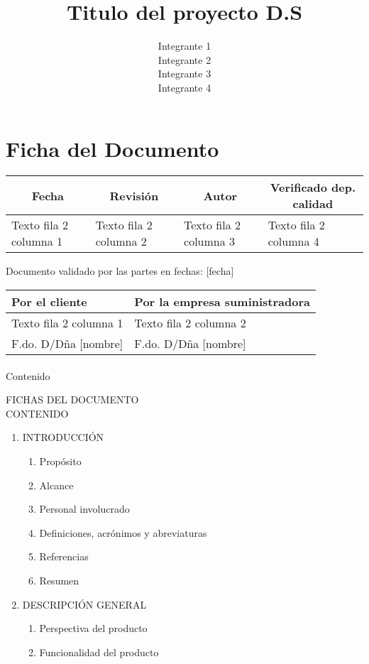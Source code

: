 \documentclass {article}
\title{Titulo del proyecto D.S}
\author{Integrante 1\\Integrante 2\\Integrante 3\\Integrante 4}
\begin{document}
\maketitle
\newpage
\section*{Ficha del Documento} 

\begin{table}[h!]
  \centering
  \begin{tabular}{|c|c|c|c|}
    \hline
    \textbf{Fecha} & \textbf{Revisión} & \textbf{Autor} & \textbf{Verificado dep. calidad} \\
    \hline
    \multicolumn{1}{|l|}{Texto fila 2 columna 1} & \multicolumn{1}{l|}{Texto fila 2 columna 2} & \multicolumn{1}{l|}{Texto fila 2 columna 3} & \multicolumn{1}{l|}{Texto fila 2 columna 4} \\
    \hline
  \end{tabular}
\end{table}
Documento validado por las partes en fechas: [fecha]
\begin{table}[h!]
  \centering
  \begin{tabular}{|l|l|}
    \hline
    \textbf{Por el cliente} & \textbf{Por la empresa suministradora} \\
    \hline
    Texto fila 2 columna 1 & Texto fila 2 columna 2 \\ \hline
    F.do. D/Dña [nombre] & F.do. D/Dña [nombre] \\ \hline
  \end{tabular}
\end{table}
\paragraph{}
\newpage
\begin{center} %
{\Huge Contenido} %
\end{center}
\vspace{1cm} %
{FICHAS DEL DOCUMENTO\\}
{CONTENIDO}
\begin{enumerate}
  \item INTRODUCCIÓN
    \begin{enumerate}[label*=\arabic*.]
      \item Propósito
      \item Alcance
      \item Personal involucrado
      \item Definiciones, acrónimos y abreviaturas
      \item Referencias
      \item Resumen
    \end{enumerate}
  \item DESCRIPCIÓN GENERAL
    \begin{enumerate}[label*=\arabic*.]
      \item Perspectiva del producto
      \item Funcionalidad del producto
    \end{enumerate}
\end{enumerate}
\newpage
\end{document}
